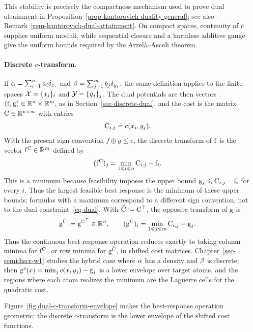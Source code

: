 This stability is precisely the compactness mechanism used to prove dual attainment in Proposition~\ref{prop-kantorovich-duality-general}; see also Remark~\ref{rem-kantorovich-dual-attainment}. On compact spaces, continuity of $c$ supplies uniform moduli, while sequential closure and a harmless additive gauge give the uniform bounds required by the Arzel\`a--Ascoli theorem.

\paragraph{Discrete $c$-transform.}
If $\alpha=\sum_{i=1}^n a_i\delta_{x_i}$ and $\beta=\sum_{j=1}^m b_j\delta_{y_j}$, the same definition applies to the finite spaces $\mathcal{X}=\{x_i\}_i$ and $\mathcal{Y}=\{y_j\}_j$. The dual potentials are then vectors $(\mathrm{f},\mathrm{g})\in\mathbb{R}^n\times\mathbb{R}^m$, as in Section~\ref{sec-discrete-dual}, and the cost is the matrix $\mathrm{C}\in\mathbb{R}^{n\times m}$ with entries
\[
	\mathrm{C}_{i,j}=c(x_i,y_j).
\]
With the present sign convention $f\oplus g\leq c$, the discrete transform of $\mathrm{f}$ is the vector $\mathrm{f}^{\mathrm{C}}\in\mathbb{R}^m$ defined by
\[
	(\mathrm{f}^{\mathrm{C}})_j
	=
	\min_{1\leqslant i\leqslant n} \mathrm{C}_{i,j}-\mathrm{f}_i.
\]
This is a minimum because feasibility imposes the upper bound $\mathrm{g}_j\leqslant \mathrm{C}_{i,j}-\mathrm{f}_i$ for every $i$. Thus the largest feasible best response is the minimum of these upper bounds; formulas with a maximum correspond to a different sign convention, not to the dual constraint~\eqref{eq-dual}.
With $\bar{\mathrm{C}}\coloneqq\mathrm{C}^\top$, the opposite transform of $\mathrm{g}$ is
\[
	\mathrm{g}^{\bar{\mathrm{C}}}\coloneqq \mathrm{g}^{\mathrm{C}^\top}\in\mathbb{R}^n,
	\qquad
	(\mathrm{g}^{\bar{\mathrm{C}}})_i
	=
	\min_{1\leqslant j\leqslant m} \mathrm{C}_{i,j}-\mathrm{g}_j.
\]
Thus the continuous best-response operation reduces exactly to taking column minima for $\mathrm{f}^{\mathrm{C}}$, or row minima for $\mathrm{g}^{\bar{\mathrm{C}}}$, in shifted cost matrices. Chapter~\ref{sec-semidiscr-w1} studies the hybrid case where $\alpha$ has a density and $\beta$ is discrete; then $\mathrm{g}^{\bar c}(x)=\min_j c(x,y_j)-\mathrm{g}_j$ is a lower envelope over target atoms, and the regions where each atom realizes the minimum are the Laguerre cells for the quadratic cost.

Figure~\ref{fig:dual-c-transform-envelope} makes the best-response operation geometric: the discrete $c$-transform is the lower envelope of the shifted cost functions.

